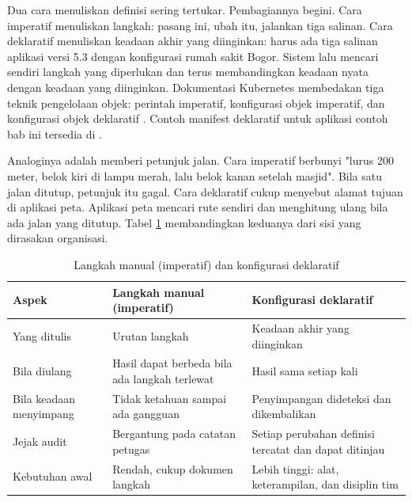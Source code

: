 Dua cara menuliskan definisi sering tertukar. Pembagiannya begini. Cara imperatif menuliskan
langkah: pasang ini, ubah itu, jalankan tiga salinan. Cara deklaratif menuliskan keadaan
akhir yang diinginkan: harus ada tiga salinan aplikasi versi 5.3 dengan konfigurasi rumah
sakit Bogor. Sistem lalu mencari sendiri langkah yang diperlukan dan terus membandingkan
keadaan nyata dengan keadaan yang diinginkan. Dokumentasi Kubernetes membedakan tiga teknik
pengelolaan objek: perintah imperatif, konfigurasi objek imperatif, dan konfigurasi objek
deklaratif \cite{c05-k8s-object-management}. Contoh manifest deklaratif untuk aplikasi
contoh bab ini tersedia di
.

Analoginya adalah memberi petunjuk jalan. Cara imperatif berbunyi "lurus 200 meter, belok
kiri di lampu merah, lalu belok kanan setelah masjid". Bila satu jalan ditutup, petunjuk itu
gagal. Cara deklaratif cukup menyebut alamat tujuan di aplikasi peta. Aplikasi peta mencari
rute sendiri dan menghitung ulang bila ada jalan yang ditutup. Tabel
\ref{tab:ch05-imperatif-deklaratif} membandingkan keduanya dari sisi yang dirasakan
organisasi.

\begin{table}[!htb]
  \centering
  \footnotesize
  \caption{Langkah manual (imperatif) dan konfigurasi deklaratif}
  \label{tab:ch05-imperatif-deklaratif}
  \begin{tabularx}{\textwidth}{>{\raggedright\arraybackslash}p{2.4cm}
    >{\raggedright\arraybackslash}X >{\raggedright\arraybackslash}X}
    \hline
    \textbf{Aspek} & \textbf{Langkah manual (imperatif)} & \textbf{Konfigurasi
      deklaratif} \\
    \hline
    Yang ditulis & Urutan langkah & Keadaan akhir yang diinginkan \\
    \hline
    Bila diulang & Hasil dapat berbeda bila ada langkah terlewat & Hasil sama setiap kali \\
    \hline
    Bila keadaan menyimpang & Tidak ketahuan sampai ada gangguan & Penyimpangan dideteksi
      dan dikembalikan \\
    \hline
    Jejak audit & Bergantung pada catatan petugas & Setiap perubahan definisi tercatat dan
      dapat ditinjau \\
    \hline
    Kebutuhan awal & Rendah, cukup dokumen langkah & Lebih tinggi: alat, keterampilan, dan
      disiplin tim \\
    \hline
  \end{tabularx}
\end{table}

